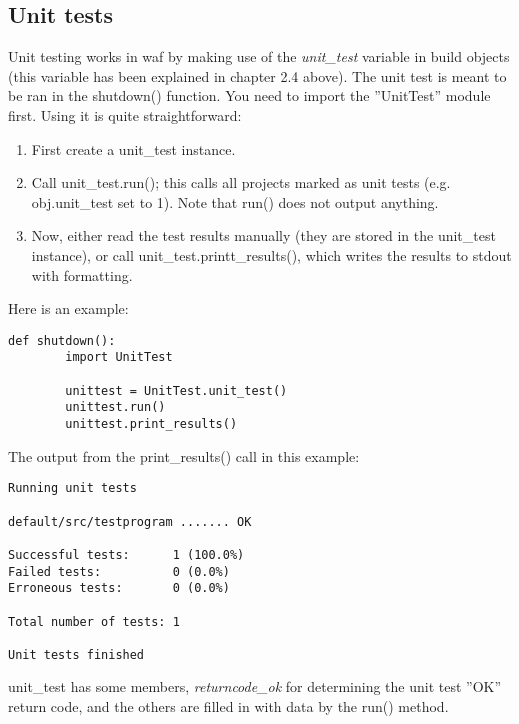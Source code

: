 \documentclass[a4paper,10pt]{article}
\begin{document}
\subsection{Unit tests}
Unit testing works in waf by making use of the \emph{unit\_test} variable in build objects (this variable has been explained in chapter 2.4 above).
The unit test is meant to be ran in the shutdown() function. You need to import the ''UnitTest'' module first. Using it is quite straightforward:\\

\begin{enumerate}
	\item First create a unit\_test instance.
	\item Call unit\_test.run(); this calls all projects marked as unit tests (e.g. obj.unit\_test set to 1). Note that run() does not output anything.
	\item Now, either read the test results manually (they are stored in the unit\_test instance), or call unit\_test.printt\_results(), which writes the results to stdout with formatting.
\end{enumerate}

Here is an example:

\begin{center}
	\begin{lstlisting}
def shutdown():
        import UnitTest

        unittest = UnitTest.unit_test()
        unittest.run()
        unittest.print_results()
	\end{lstlisting}
\end{center}

The output from the print\_results() call in this example:

\begin{center}
	\begin{verbatim}
Running unit tests

default/src/testprogram ....... OK

Successful tests:      1 (100.0%)
Failed tests:          0 (0.0%)
Erroneous tests:       0 (0.0%)

Total number of tests: 1

Unit tests finished
	\end{verbatim}
\end{center}

unit\_test has some members, \emph{returncode\_ok} for determining the unit test ''OK'' return code, and the others are filled in with data by the run() method.
\end{document}
